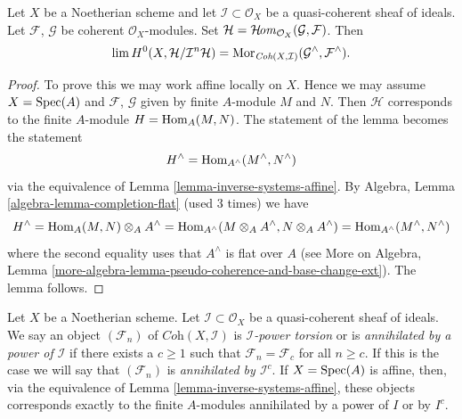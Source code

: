 \begin{lemma}
\label{lemma-completion-internal-hom}
Let $X$ be a Noetherian scheme and let $\mathcal{I} \subset \mathcal{O}_X$
be a quasi-coherent sheaf of ideals. Let $\mathcal{F}$, $\mathcal{G}$ be
coherent $\mathcal{O}_X$-modules. Set
$\mathcal{H} = \mathop{\mathcal{H}\!\mathit{om}}\nolimits_{\mathcal{O}_X}(\mathcal{G}, \mathcal{F})$.
Then
$$
\mathop{\mathrm{lim}}\nolimits H^0(X, \mathcal{H}/\mathcal{I}^n\mathcal{H}) =
\mathop{\mathrm{Mor}}\nolimits_{\textit{Coh}(X, \mathcal{I})}
(\mathcal{G}^\wedge, \mathcal{F}^\wedge).
$$
\end{lemma}

\begin{proof}
To prove this we may work affine locally on $X$.
Hence we may assume $X = \mathop{\mathrm{Spec}}(A)$ and $\mathcal{F}$, $\mathcal{G}$
given by finite $A$-module $M$ and $N$. Then $\mathcal{H}$
corresponds to the finite $A$-module $H = \mathop{\mathrm{Hom}}\nolimits_A(M, N)$.
The statement of the lemma becomes the statement
$$
H^\wedge = \mathop{\mathrm{Hom}}\nolimits_{A^\wedge}(M^\wedge, N^\wedge)
$$
via the equivalence of Lemma \ref{lemma-inverse-systems-affine}.
By Algebra, Lemma \ref{algebra-lemma-completion-flat}
(used 3 times) we have
$$
H^\wedge = \mathop{\mathrm{Hom}}\nolimits_A(M, N) \otimes_A A^\wedge =
\mathop{\mathrm{Hom}}\nolimits_{A^\wedge}(M \otimes_A A^\wedge, N \otimes_A A^\wedge) =
\mathop{\mathrm{Hom}}\nolimits_{A^\wedge}(M^\wedge, N^\wedge)
$$
where the second equality uses that $A^\wedge$ is flat over $A$
(see More on Algebra, Lemma
\ref{more-algebra-lemma-pseudo-coherence-and-base-change-ext}).
The lemma follows.
\end{proof}

\noindent
Let $X$ be a Noetherian scheme. Let $\mathcal{I} \subset \mathcal{O}_X$
be a quasi-coherent sheaf of ideals. We say an object $(\mathcal{F}_n)$ of
$\textit{Coh}(X, \mathcal{I})$ is {\it $\mathcal{I}$-power torsion}
or is {\it annihilated by a power of $\mathcal{I}$} if there exists
a $c \geq 1$ such that $\mathcal{F}_n = \mathcal{F}_c$ for all $n \geq c$.
If this is the case we will say that $(\mathcal{F}_n)$ is {\it annihilated by
$\mathcal{I}^c$}. If $X = \mathop{\mathrm{Spec}}(A)$ is affine, then, via the equivalence of
Lemma \ref{lemma-inverse-systems-affine},
these objects corresponds exactly to the finite $A$-modules
annihilated by a power of $I$ or by $I^c$.

